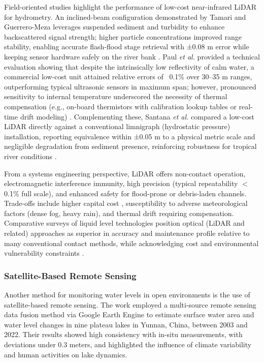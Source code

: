 \documentclass[conference]{IEEEtran}
\begin{document}
Field-oriented studies highlight the performance of low-cost near-infrared LiDAR for hydrometry. An inclined-beam configuration demonstrated by Tamari and Guerrero-Meza leverages suspended sediment and turbidity to enhance backscattered signal strength; higher particle concentrations improved range stability, enabling accurate flash-flood stage retrieval with ±0.08 m error while keeping sensor hardware safely on the river bank \cite{tamari_2016_flash}. Paul \textit{et al.} provided a technical evaluation showing that despite the intrinsically low reflectivity of calm water, a commercial low-cost unit attained relative errors of ~0.1\% over 30–35 m ranges, outperforming typical ultrasonic sensors in maximum span; however, pronounced sensitivity to internal temperature underscored the necessity of thermal compensation (e.g., on-board thermistors with calibration lookup tables or real-time drift modeling) \cite{paul_2020_a}. Complementing these, Santana \textit{et al.} compared a low-cost LiDAR directly against a conventional limnigraph (hydrostatic pressure) installation, reporting equivalence within ±0.05 m to a physical metric scale and negligible degradation from sediment presence, reinforcing robustness for tropical river conditions \cite{santana_2024_development}.

From a systems engineering perspective, LiDAR offers non-contact operation, electromagnetic interference immunity, high precision (typical repeatability $<$0.1\% full scale), and enhanced safety for flood-prone or debris-laden channels. Trade-offs include higher capital cost , susceptibility to adverse meteorological factors (dense fog, heavy rain), and thermal drift requiring compensation. Comparative surveys of liquid level technologies position optical (LiDAR and related) approaches as superior in accuracy and maintenance profile relative to many conventional contact methods, while acknowledging cost and environmental vulnerability constraints \cite{singh_2018_review}.

\subsubsection{Satellite-Based Remote Sensing}

Another method for monitoring water levels in open environments is the use of satellite-based remote sensing. The work \cite{jiang_2024_monitoring} employed a multi-source remote sensing data fusion method via Google Earth Engine to estimate surface water area and water level changes in nine plateau lakes in Yunnan, China, between 2003 and 2022. Their results showed high consistency with in-situ measurements, with deviations under 0.3 meters, and highlighted the influence of climate variability and human activities on lake dynamics.
\end{document}
